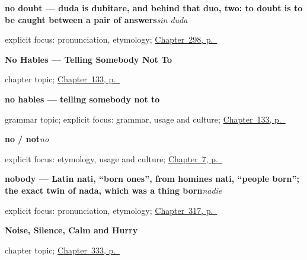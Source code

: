 \noindent\begin{minipage}[t]{\linewidth}
\raggedright
\textbf{no doubt — duda is dubitare, and behind that duo, two: to doubt is to be caught between a pair of answers}\enspace\emph{sin duda}\par
\footnotesize explicit focus: pronunciation, etymology; \hyperref[ch:mas-respuestas]{Chapter~298, p.~\pageref*{ch:mas-respuestas}}
\end{minipage}\par\smallskip

\noindent\begin{minipage}[t]{\linewidth}
\raggedright
\textbf{No Hables --- Telling Somebody Not To}\par
\footnotesize chapter topic; \hyperref[ch:command-negative]{Chapter~133, p.~\pageref*{ch:command-negative}}
\end{minipage}\par\smallskip

\noindent\begin{minipage}[t]{\linewidth}
\raggedright
\textbf{no hables — telling somebody not to}\par
\footnotesize grammar topic; explicit focus: grammar, usage and culture; \hyperref[ch:command-negative]{Chapter~133, p.~\pageref*{ch:command-negative}}
\end{minipage}\par\smallskip

\noindent\begin{minipage}[t]{\linewidth}
\raggedright
\textbf{no / not}\enspace\emph{no}\par
\footnotesize explicit focus: etymology, usage and culture; \hyperref[ch:thank-you]{Chapter~7, p.~\pageref*{ch:thank-you}}
\end{minipage}\par\smallskip

\noindent\begin{minipage}[t]{\linewidth}
\raggedright
\textbf{nobody — Latin nati, \textquotedblleft{}born ones\textquotedblright{}, from homines nati, \textquotedblleft{}people born\textquotedblright{}; the exact twin of nada, which was a thing born}\enspace\emph{nadie}\par
\footnotesize explicit focus: pronunciation, etymology; \hyperref[ch:algo-y-nadie]{Chapter~317, p.~\pageref*{ch:algo-y-nadie}}
\end{minipage}\par\smallskip

\noindent\begin{minipage}[t]{\linewidth}
\raggedright
\textbf{Noise, Silence, Calm and Hurry}\par
\footnotesize chapter topic; \hyperref[ch:calma-y-prisa]{Chapter~333, p.~\pageref*{ch:calma-y-prisa}}
\end{minipage}\par\smallskip

